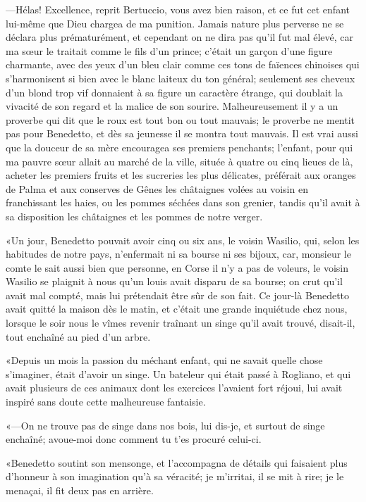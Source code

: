 —Hélas! Excellence, reprit Bertuccio, vous avez bien raison, et ce fut cet enfant lui-même que Dieu chargea de ma punition. Jamais nature plus perverse ne se déclara plus prématurément, et cependant on ne dira pas qu'il fut mal élevé, car ma sœur le traitait comme le fils d'un prince; c'était un garçon d'une figure charmante, avec des yeux d'un bleu clair comme ces tons de faïences chinoises qui s'harmonisent si bien avec le blanc laiteux du ton général; seulement ses cheveux d'un blond trop vif donnaient à sa figure un caractère étrange, qui doublait la vivacité de son regard et la malice de son sourire. Malheureusement il y a un proverbe qui dit que le roux est tout bon ou tout mauvais; le proverbe ne mentit pas pour Benedetto, et dès sa jeunesse il se montra tout mauvais. Il est vrai aussi que la douceur de sa mère encouragea ses premiers penchants; l'enfant, pour qui ma pauvre sœur allait au marché de la ville, située à quatre ou cinq lieues de là, acheter les premiers fruits et les sucreries les plus délicates, préférait aux oranges de Palma et aux conserves de Gênes les châtaignes volées au voisin en franchissant les haies, ou les pommes séchées dans son grenier, tandis qu'il avait à sa disposition les châtaignes et les pommes de notre verger. 

«Un jour, Benedetto pouvait avoir cinq ou six ans, le voisin Wasilio, qui, selon les habitudes de notre pays, n'enfermait ni sa bourse ni ses bijoux, car, monsieur le comte le sait aussi bien que personne, en Corse il n'y a pas de voleurs, le voisin Wasilio se plaignit à nous qu'un louis avait disparu de sa bourse; on crut qu'il avait mal compté, mais lui prétendait être sûr de son fait. Ce jour-là Benedetto avait quitté la maison dès le matin, et c'était une grande inquiétude chez nous, lorsque le soir nous le vîmes revenir traînant un singe qu'il avait trouvé, disait-il, tout enchaîné au pied d'un arbre. 

«Depuis un mois la passion du méchant enfant, qui ne savait quelle chose s'imaginer, était d'avoir un singe. Un bateleur qui était passé à Rogliano, et qui avait plusieurs de ces animaux dont les exercices l'avaient fort réjoui, lui avait inspiré sans doute cette malheureuse fantaisie. 

«—On ne trouve pas de singe dans nos bois, lui dis-je, et surtout de singe enchaîné; avoue-moi donc comment tu t'es procuré celui-ci. 

«Benedetto soutint son mensonge, et l'accompagna de détails qui faisaient plus d'honneur à son imagination qu'à sa véracité; je m'irritai, il se mit à rire; je le menaçai, il fit deux pas en arrière. 

